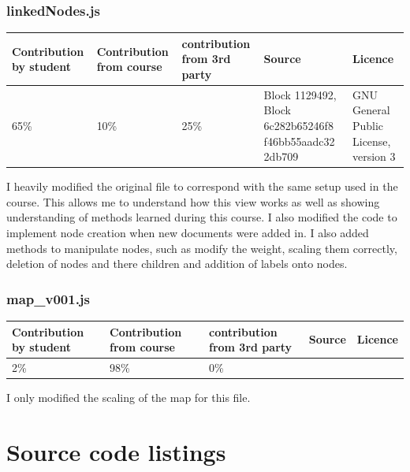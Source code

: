 \documentclass[a4paper, 11pt]{article}
\begin{document}
\subsubsection{linkedNodes.js}
\begin{center}
 \begin{tabular}{||p{}|p{}|p{}|p{}|p{}||} 
 \hline
 Contribution by student & Contribution from course & contribution from 3rd party & Source & Licence 
 \\
 \hline
 65\% & 10\% & 25\% & Block 1129492, Block 6c282b65246f8 f46bb55aadc32 2db709 &  GNU General Public License, version 3
 \\
 \hline
\end{tabular}
\end{center}
I heavily modified the original file to correspond with the same setup used in the course. This allows me to understand how this view works as well as showing understanding of methods learned during this course. I also modified the code to implement node creation when new documents were added in. I also added methods to manipulate nodes, such as modify the weight, scaling them correctly, deletion of nodes and there children and addition of labels onto nodes.


\subsubsection{map\_v001.js}
\begin{center}
 \begin{tabular}{||p{}|p{}|p{}|p{}|p{}||} 
 \hline
 Contribution by student & Contribution from course & contribution from 3rd party & Source & Licence 
 \\
 \hline
 2\% & 98\% & 0\% &  & 
 \\
 \hline
\end{tabular}
\end{center}
I only modified the scaling of the map for this file.




\newpage
\section*{Source code listings}
\end{document}
